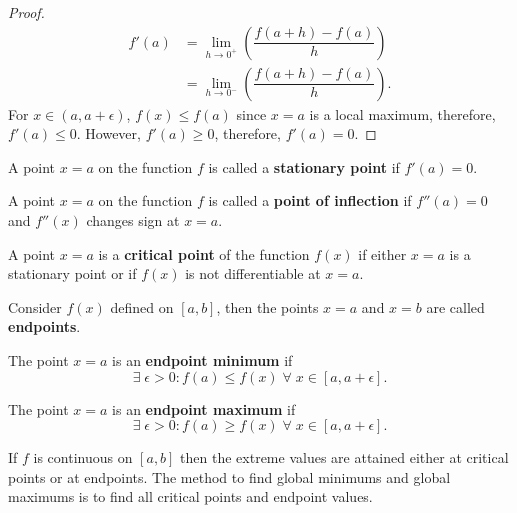 \begin{proof}
	\begin{align*}
		f'(a)&=\lim_{h\to0^+}\left(\dfrac{f(a+h)-f(a)}{h}\right)\\
		&=\lim_{h\to0^-}\left(\dfrac{f(a+h)-f(a)}{h}\right).
	\end{align*}
	For $x\in(a,a+\epsilon)$, $f(x)\leq f(a)$ since $x=a$ is a local maximum, therefore, $f'(a)\leq 0$. However, $f'(a)\geq0$, therefore, $f'(a)=0$.
\end{proof}

\begin{definition}
	A point $x=a$ on the function $f$ is called a \textbf{stationary point} if $f'(a)=0$.
\end{definition}

\begin{definition}
    A point $x=a$ on the function $f$ is called a \textbf{point of inflection} if $f''(a)=0$ and $f''(x)$ changes sign at $x=a$.
\end{definition}

\begin{definition}
	A point $x=a$ is a \textbf{critical point} of the function $f(x)$ if either $x=a$ is a stationary point or if $f(x)$ is not differentiable at $x=a$.
\end{definition}

\begin{remark}
    Consider $f(x)$ defined on $[a,b]$, then the points $x=a$ and $x=b$ are called \textbf{endpoints}.
\end{remark}

\begin{definition}
    The point $x=a$ is an \textbf{endpoint minimum} if \[\exists\;\epsilon>0:f(a)\leq f(x)\;\forall\;x\in[a,a+\epsilon].\]
\end{definition}

\begin{definition}
    The point $x=a$ is an \textbf{endpoint maximum} if \[\exists\;\epsilon>0:f(a)\geq f(x)\;\forall\;x\in[a,a+\epsilon].\]
\end{definition}

\begin{remark}
    If $f$ is continuous on $[a,b]$ then the extreme values are attained either at critical points or at endpoints. The method to find global minimums and global maximums is to find all critical points and endpoint values.
\end{remark}

